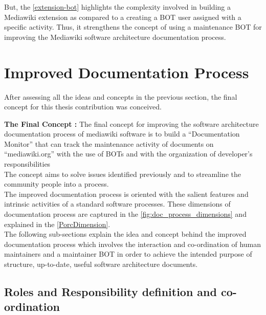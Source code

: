 \begin{enumerate}
But, the \autoref{extension-bot} highlights the complexity involved in building a Mediawiki extension as compared to a creating a BOT user assigned with a specific activity. Thus, it strengthens the concept of using a maintenance BOT for improving the Mediawiki software architecture documentation process.
\end{enumerate}

\section{Improved Documentation Process}
\indent After assessing all the ideas and concepts in the previous section, the final concept for this thesis contribution was conceived.

\textbf{The Final Concept : }
\newline
\indent The final concept for improving the software architecture documentation process of mediawiki software is to build  a \enquote{Documentation Monitor} that can track the maintenance activity of documents on \enquote{mediawiki.org} with the use of BOTs and with the organization of developer's responsibilities
\\\indent The concept aims to solve issues identified previously and to streamline the community people into a process.
\\\indent The improved documentation process is oriented with the salient features and intrinsic activities of a standard software processes. These dimensions of documentation process are captured in the \autoref{fig:doc_process_dimensions} and explained in the \autoref{PorcDimension}.
\\\indent The following sub-sections explain the idea and concept behind the improved documentation process which involves the interaction and co-ordination of human maintainers and a maintainer BOT in order to achieve the intended purpose of structure, up-to-date, useful software architecture documents.


\subsection{Roles and Responsibility definition and co-ordination}

